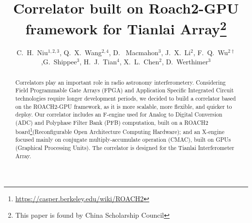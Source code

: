 \documentclass{ws-jai}
\begin{document}


\title{Correlator built on Roach2-GPU framework for Tianlai Array\footnote{This paper is found by  China Scholarship Council }}  

\author{
C.~H.~Niu$^{1,2,3}$, Q.~X.~Wang$^{2,4}$, D.~ Macmahon$^3$, J.~X.~Li$^2$,  F.~Q.~Wu$^{2\dagger}$,G.~Shippee$^3$, H.~J.~Tian$^4$, X.~L.~Chen$^2$, D.~Werthimer$^3$
}

\address{
\small
$^1$Central China Normal University ,Luoyu Road, Wuhan, China\\
$^2$National Astronomy Observatory , Chinese Academy of Sciences \\Datun(A) Road, No.30,Beijing, China\\
$^3$University of California Berkeley, Campbell Hall 339, Berkeley CA 94720\\
$^4$China Three Gorges University,Yichang China 443002
}

\maketitle
{}


\begin{abstract}
Correlators play an important role in radio astronomy interferometery. Considering Field Programmable Gate Arrays (FPGA) and Application Specific Integrated Circuit technologies require longer development periods, we decided to build a correlator based on the ROACH2-GPU framework, as it is more scalable, more flexible, and quicker to deploy. Our correlator includes an F-engine used for Analog to Digital Conversion (ADC) and Polyphase Filter Bank (PFB) computation, built on a ROACH2 board\footnote{ \url{https://casper.berkeley.edu/wiki/ROACH2}}(Reconfigurable Open Architecture Computing Hardware); and an X-engine focused mainly on conjugate multiply-accumulate operation (CMAC), built on GPUs (Graphical Processing Units). The correlator is designed for the Tianlai Interferometer Array.

\end{abstract}
%
\end{document}
